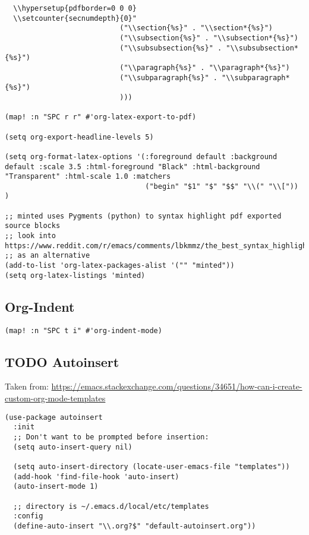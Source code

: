 \documentclass[8pt]{article}
\begin{document}
\begin{verbatim}
  \\hypersetup{pdfborder=0 0 0}
  \\setcounter{secnumdepth}{0}"
                           ("\\section{%s}" . "\\section*{%s}")
                           ("\\subsection{%s}" . "\\subsection*{%s}")
                           ("\\subsubsection{%s}" . "\\subsubsection*{%s}")
                           ("\\paragraph{%s}" . "\\paragraph*{%s}")
                           ("\\subparagraph{%s}" . "\\subparagraph*{%s}")
                           )))

(map! :n "SPC r r" #'org-latex-export-to-pdf)

(setq org-export-headline-levels 5)

(setq org-format-latex-options '(:foreground default :background default :scale 3.5 :html-foreground "Black" :html-background "Transparent" :html-scale 1.0 :matchers
                                 ("begin" "$1" "$" "$$" "\\(" "\\[")) )

;; minted uses Pygments (python) to syntax highlight pdf exported source blocks
;; look into https://www.reddit.com/r/emacs/comments/lbkmmz/the_best_syntax_highlighting_in_a_pdf_youll_see_a/
;; as an alternative
(add-to-list 'org-latex-packages-alist '("" "minted"))
(setq org-latex-listings 'minted)
\end{verbatim}
\subsection{Org-Indent}
\label{sec:org71402fa}
\begin{verbatim}
(map! :n "SPC t i" #'org-indent-mode)
\end{verbatim}
\subsection{{\bfseries\sffamily TODO} Autoinsert}
\label{sec:org053a4e1}
Taken from: \url{https://emacs.stackexchange.com/questions/34651/how-can-i-create-custom-org-mode-templates}
\begin{verbatim}
(use-package autoinsert
  :init
  ;; Don't want to be prompted before insertion:
  (setq auto-insert-query nil)

  (setq auto-insert-directory (locate-user-emacs-file "templates"))
  (add-hook 'find-file-hook 'auto-insert)
  (auto-insert-mode 1)

  ;; directory is ~/.emacs.d/local/etc/templates
  :config
  (define-auto-insert "\\.org?$" "default-autoinsert.org"))

\end{verbatim}
\end{document}
